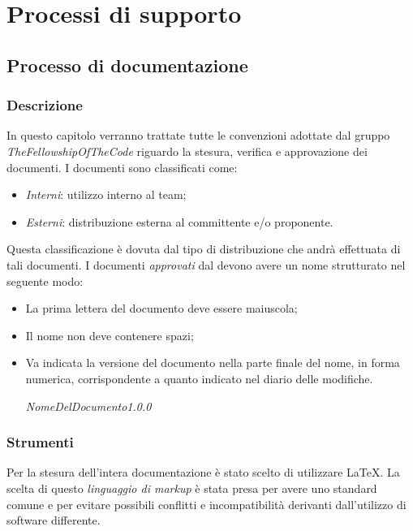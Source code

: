 \section{Processi di supporto}
\subsection{Processo di documentazione}
\subsubsection{Descrizione}
In questo capitolo verranno trattate tutte le convenzioni adottate dal gruppo 
\textit{TheFellowshipOfTheCode} riguardo la stesura, verifica e approvazione dei 
documenti.
I documenti sono classificati come:
\begin{itemize}
  \item \textit{Interni}: utilizzo interno al team;
  \item \textit{Esterni}: distribuzione esterna al committente e/o proponente.
\end{itemize}
Questa classificazione è dovuta dal tipo di distribuzione che andrà effettuata di tali documenti.
I documenti \textit{approvati} dal \textit{\RdP} devono avere un nome strutturato nel seguente modo:
\begin{itemize}
  \item La prima lettera del documento deve essere maiuscola;
  \item Il nome non deve contenere spazi;
  \item Va indicata la versione del documento nella parte finale del nome, in forma numerica, 
  corrispondente a quanto indicato nel diario delle modifiche. 
  \begin{center}
  \textit{NomeDelDocumento1.0.0}
  \end{center}
\end{itemize}
\subsubsection{Strumenti}
Per la stesura dell'intera documentazione è stato scelto di utilizzare \LaTeX{}. 
La scelta di questo \textit{linguaggio di markup} è stata presa per avere uno 
standard comune e per evitare possibili conflitti e incompatibilità derivanti 
dall'utilizzo di software differente.
